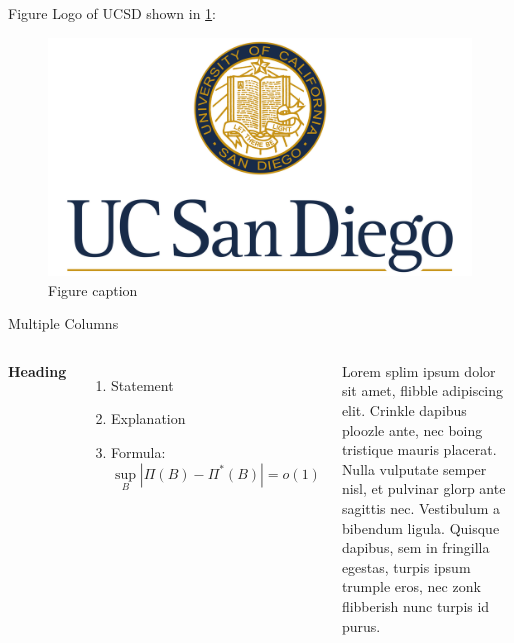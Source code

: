\documentclass[aspectratio=169,xcolor=x11names]{beamer}
\begin{document}

\begin{frame}{Figure}
Logo of UCSD shown in \cref{Fig:example}:
    \begin{figure}
    \includegraphics[scale = 0.05]{UCSD-Symbol.png}
    \caption{Figure caption \label{Fig:example}}  
    \end{figure}
\end{frame}


\begin{frame}{Multiple Columns}
    \begin{columns}[c] %

        \textbf{Heading}
        \begin{enumerate}
            \item Statement
            \item Explanation
            \item Formula:
            $$
            \sup_{B}|\Pi(B) -\Pi^*(B)| = o(1)
            $$
        \end{enumerate}

        Lorem splim ipsum dolor sit amet, flibble adipiscing elit. Crinkle dapibus ploozle ante, nec boing tristique mauris placerat. Nulla vulputate semper nisl, et pulvinar glorp ante sagittis nec. Vestibulum a bibendum ligula. Quisque dapibus, sem in fringilla egestas, turpis ipsum trumple eros, nec zonk flibberish nunc turpis id purus.

    \end{columns}
\end{frame}
\end{document}
